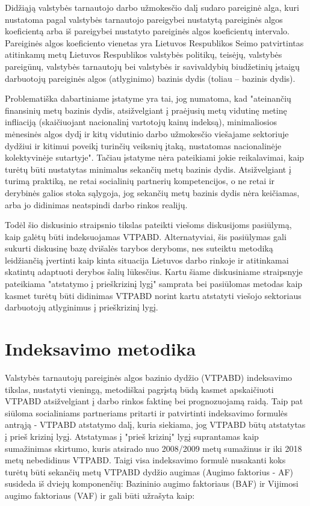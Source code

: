 \documentclass[titlepage, 11pt]{article}
\begin{document}
Didžiąją valstybės tarnautojo darbo užmokesčio dalį sudaro pareiginė alga, kuri nustatoma pagal valstybės tarnautojo pareigybei nustatytą pareiginės algos koeficientą arba iš pareigybei nustatyto pareiginės algos koeficientų intervalo. Pareiginės algos koeficiento vienetas yra Lietuvos Respublikos Seimo patvirtintas atitinkamų metų Lietuvos Respublikos valstybės politikų, teisėjų, valstybės pareigūnų, valstybės tarnautojų bei valstybės ir savivaldybių biudžetinių įstaigų darbuotojų pareiginės algos (atlyginimo) bazinis dydis (toliau – bazinis dydis). 

Problematiška dabartiniame įstatyme yra tai, jog numatoma, kad "ateinančių finansinių metų bazinis dydis, atsižvelgiant į praėjusių metų vidutinę metinę infliaciją (skaičiuojant nacionalinį vartotojų kainų indeksą), minimaliosios mėnesinės algos dydį ir kitų vidutinio darbo užmokesčio viešajame sektoriuje dydžiui ir kitimui poveikį turinčių veiksnių įtaką, nustatomas nacionalinėje kolektyvinėje sutartyje". Tačiau įstatyme nėra pateikiami jokie reikalavimai, kaip turėtų būti nustatytas minimalus sekančių metų bazinis dydis. Atsižvelgiant į turimą praktiką, ne retai socialinių partnerių kompetencijos, o ne retai ir derybinės galios stoka sąlygoja, jog sekančių metų bazinis dydis nėra keičiamas, arba jo didinimas neatspindi darbo rinkos realijų.

Todėl šio diskusinio straipsnio tikslas pateikti viešoms diskusijoms pasiūlymą, kaip galėtų būti indeksuojamas VTPABD. Alternatyviai, šis pasiūlymas gali sukurti diskusinę bazę dvišalės tarybos deryboms, nes suteiktu metodiką leidžiančią įvertinti kaip kinta situacija Lietuvos darbo rinkoje ir atitinkamai skatintų adaptuoti derybos šalių lūkesčius. Kartu šiame diskusiniame straipsnyje pateikiama "atstatymo į prieškrizinį lygį" samprata bei pasiūlomas metodas kaip kasmet turėtų būti didinimas VTPABD norint kartu atstatyti viešojo sektoriaus darbuotojų atlyginimus į prieškrizinį lygį.

\section{Indeksavimo metodika}
Valstybės tarnautojų pareiginės algos bazinio dydžio (VTPABD) indeksavimo tikslas, nustatyti vieningą, metodiškai pagrįstą būdą kasmet apskaičiuoti VTPABD atsižvelgiant į darbo rinkos faktinę bei prognozuojamą raidą.
Taip pat siūloma socialiniams partneriams pritarti ir patvirtinti  indeksavimo formulės antrąją - VTPABD atstatymo dalį, kuria siekiama, jog VTPABD būtų atstatytas į prieš krizinį lygį. Atstatymas į "prieš krizinį" lygį suprantamas kaip sumažinimas skirtumo, kuris atsirado nuo 2008/2009 metų sumažinus ir iki 2018 metų nebedidinus VTPABD. 
Taigi visa indeksavimo formulė nusakanti koks turėtų būti sekančių metų VTPABD dydžio augimas (Augimo faktorius - AF) susideda iš dviejų komponenčių: Bazininio augimo faktoriaus (BAF) ir Vijimosi augimo faktoriaus (VAF) ir gali būti užrašyta kaip:
\end{document}
